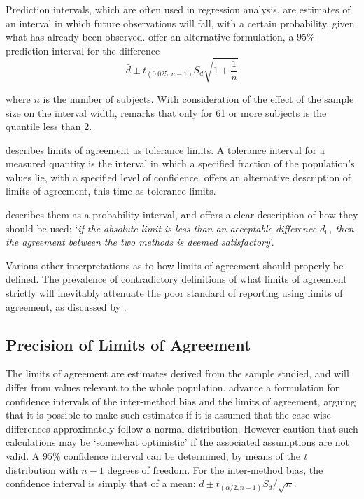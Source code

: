 \documentclass[12pt, a4paper]{report}
\theoremstyle{plain}
\theoremstyle{definition}
\theoremstyle{remark}
\begin{document}
Prediction intervals, which are often used in regression analysis, are estimates of an interval in which future
observations will fall, with a certain probability, given what has already been observed. \citet{BXC2008} offer an alternative
formulation, a $95\%$ prediction interval for the difference
\begin{equation}
\bar{d} \pm t_{(0.025, n-1)}S_{d} \sqrt{1+\frac{1}{n}}
\end{equation}

 where $n$ is the number of subjects. With consideration of the effect of the sample size on the interval
width, \citet{BXC2008} remarks that only for 61 or more subjects is the quantile less than 2.

\citet{luiz} describes limits of agreement as tolerance limits. A
tolerance interval for a measured quantity is the interval in
which a specified fraction of the population's values lie, with a
specified level of confidence. \citet{luiz} offers an alternative description of limits of agreement, this time as tolerance limits. 

\citet{Barnhart} describes them as a probability interval, and offers a clear description of how they should be used; `\textit{if the absolute limit is less than an acceptable difference $d_{0}$, then the agreement between the two methods is deemed satisfactory}'.

Various other interpretations as to how limits of agreement should properly be defined. The prevalence of contradictory definitions of what limits of agreement strictly will inevitably attenuate the poor standard of reporting using limits of agreement, as discussed by \citet{mantha}.




\subsection{Precision of Limits of Agreement}

The limits of agreement are estimates derived from the sample studied, and will differ from values relevant to the whole
population. \citet*{BA86} advance a formulation for confidence
intervals of the inter-method bias and the limits of agreement, arguing that it is possible to make such estimates if it is assumed that the case-wise differences approximately follow a normal distribution. However \citet*{BA99} caution that such calculations may be `somewhat
optimistic' if the associated assumptions are not valid. A $95\%$ confidence interval can be determined, by means of the
\emph{t} distribution with $n-1$ degrees of freedom. For the inter-method bias, the confidence interval is simply that of a mean: $\bar{d} \pm t_{(\alpha/2,n-1)} S_{d}/\sqrt{n}$.
\end{document}
